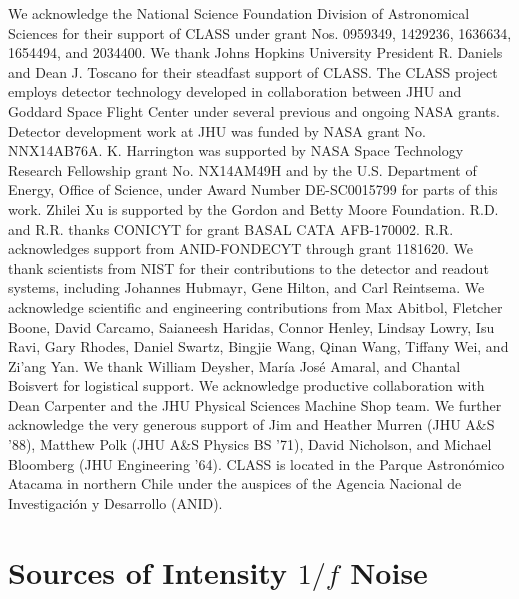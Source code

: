 \documentclass[twocolumn, tighten, numberedappendix, twocolappendix]{aastex63}
\begin{document}
We acknowledge the National Science Foundation Division of Astronomical Sciences for their support of CLASS under grant Nos. 0959349, 1429236, 1636634, 1654494, and 2034400. We thank Johns Hopkins University President R. Daniels and Dean J. Toscano for their steadfast support of CLASS. The CLASS project employs detector technology developed in collaboration between JHU and Goddard Space Flight Center under several previous and ongoing NASA grants. Detector development work at JHU was funded by NASA grant No. NNX14AB76A. K. Harrington was supported by NASA Space Technology Research Fellowship grant No. NX14AM49H and by the U.S. Department of Energy, Office of Science, under Award Number DE-SC0015799 for parts of this work. Zhilei Xu is supported by the Gordon and Betty Moore Foundation. R.D. and R.R. thanks CONICYT for grant BASAL CATA AFB-170002. R.R. acknowledges support from ANID-FONDECYT through grant 1181620. We thank scientists from NIST for their contributions to the detector and readout systems, including Johannes Hubmayr, Gene Hilton, and Carl Reintsema. We acknowledge scientific and engineering contributions from Max Abitbol, Fletcher Boone, David Carcamo, Saianeesh Haridas, Connor Henley, Lindsay Lowry, Isu Ravi, Gary Rhodes, Daniel Swartz, Bingjie Wang, Qinan Wang, Tiffany Wei, and Zi'ang Yan. We thank William Deysher, Mar\'ia Jos\'e Amaral, and Chantal Boisvert for logistical support. We acknowledge productive collaboration with Dean Carpenter and the JHU Physical Sciences Machine Shop team. We further acknowledge the very generous support of Jim and Heather Murren (JHU A\&S '88), Matthew Polk (JHU A\&S Physics BS '71), David Nicholson, and Michael Bloomberg (JHU Engineering '64). CLASS is located in the Parque Astron\'omico Atacama in northern Chile under the auspices of the Agencia Nacional de Investigaci\'on y Desarrollo (ANID).



\appendix
\section{\label{sec:single_dets} Sources of Intensity \lowercase{$1/f$} Noise}
\end{document}
